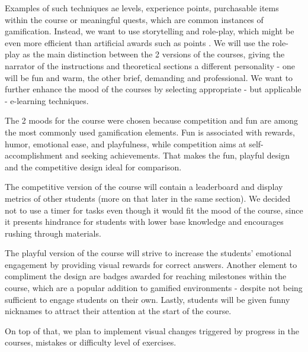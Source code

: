 Examples of such techniques ae levels, experience points, purchasable items within the course or meaningful quests, which are common instances of gamification. Instead, we want to use storytelling and role-play, which might be even more efficient than artificial awards such as points \cite{gamification_personalization}. We will use the role-play as the main distinction between the 2 versions of the courses, giving the narrator of the instructions and theoretical sections a different personality - one will be fun and warm, the other brief, demanding and professional. We want to further enhance the mood of the courses by selecting appropriate - but applicable - e-learning techniques.

The 2 moods for the course were chosen because competition and fun are among the most commonly used gamification elements. Fun is associated with rewards, humor, emotional ease, and playfulness, while competition aims at self-accomplishment and seeking achievements. That makes the fun, playful design and the competitive design ideal for comparison.

The competitive version of the course will contain a leaderboard and display metrics of other students (more on that later in the same section). We decided not to use a timer for tasks even though it would fit the mood of the course, since it presents hindrance for students with lower base knowledge and encourages rushing through materials.

The playful version of the course will strive to increase the students' emotional engagement by providing visual rewards for correct answers. Another element to compliment the design are badges awarded for reaching milestones within the course, which are a popular addition to gamified environments - despite not being sufficient to engage students on their own. Lastly, students will be given funny nicknames to attract their attention at the start of the course.

On top of that, we plan to implement visual changes triggered by progress in the courses, mistakes or difficulty level of exercises. 

